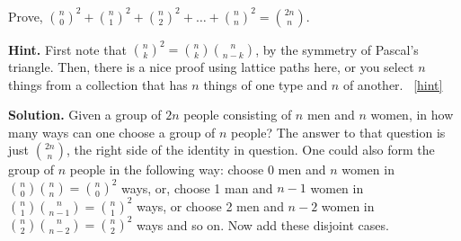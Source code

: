 \documentclass{book}
\begin{document}
\setcounter{project}{101}
\addtocounter{project}{-1}
\begin{activity}[]\label{activity-94}
\hypertarget{p-724}{}%
Prove, \(\binom{n}{0}^{2} + \binom{n}{1}^{2} + \binom{n}{2}^{2} + \ldots + \binom{n}{n}^{2} = \binom{2n}{n}\).%
\par\smallskip%
\noindent\textbf{Hint.}\hypertarget{hint-55}{}\quad%
\hypertarget{p-725}{}%
First note that \(\binom{n}{k}^2 = \binom{n}{k}\binom{n}{n-k}\), by the symmetry of Pascal's triangle.  Then, there is a nice proof using lattice paths here, or you select \(n\) things from a collection that has \(n\) things of one type and \(n\) of another.%
~\hfill{\tiny\hyperlink{a-101}{[hint]}\hypertarget{q-101}{}}\par\smallskip%
\noindent\textbf{Solution.}\hypertarget{solution-56}{}\quad%
\hypertarget{p-726}{}%
Given a group of \(2n\) people consisting of \(n\) men and \(n\) women, in how many ways can one choose a group of \(n\) people? The answer to that question is just \(\binom{2n}{n}\), the right side of the identity in question. One could also form the group of \(n\) people in the following way: choose 0 men and \(n\) women in \(\binom{n}{0} \binom{n}{n} = \binom{n}{0}^{2}\) ways, or, choose 1 man and \(n - 1\) women in \(\binom{n}{1} \binom{n}{n - 1} = \binom{n}{1}^{2}\) ways, or choose 2 men and \(n - 2\) women in \(\binom{n}{2} \binom{n}{n - 2} = \binom{n}{2}^{2}\) ways and so on. Now add these disjoint cases.%
\end{activity}

\clearpage
\end{document}

